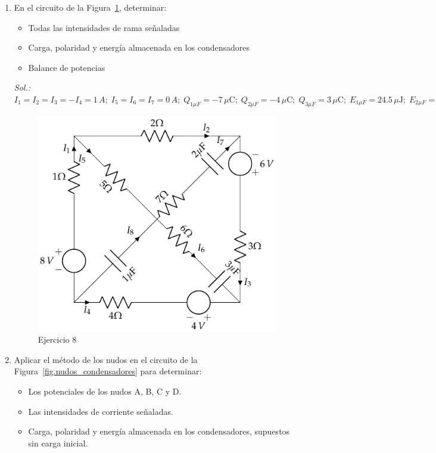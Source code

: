\documentclass[11pt]{book} %
\begin{document}
\begin{enumerate}
\item En el circuito de la Figura~\ref{fig.ej9_BT1}, determinar:
\begin{itemize}
    \item Todas las intensidades de rama señaladas
    \item Carga, polaridad y energía almacenada en los condensadores
    \item Balance de potencias
\end{itemize}
\emph{Sol.: $I_1=I_2=I_3=-I_4=1\,A;\; I_5=I_6=I_7=0\,A;\;Q_{1\mu F}=-7\,\mu\text{C};\;Q_{2\mu F}=-4\,\mu\text{C};\;Q_{3\mu F}=3\,\mu\text{C};\;E_{1\mu F}=24.5\,\mu\text{J};\;E_{2\mu F}=4\,\mu\text{J};\; E_{3\mu F}=1.5\,\mu\text{J}$}
\begin{figure}[htbp]
    \centering
    \includegraphics{../figs/ej9_BT1.pdf}
    \caption{Ejercicio 8}
    \label{fig.ej9_BT1}
\end{figure}
\item Aplicar el método de los nudos en el circuito de la Figura~\ref{fig.nudos_condensadores} para determinar:
\begin{itemize}
\item Los potenciales de los nudos A, B, C y D.
\item Las intensidades de corriente señaladas.
\item Carga, polaridad y energía almacenada en los condensadores, supuestos sin carga inicial.
\end{itemize}

\end{enumerate}
\end{document}
